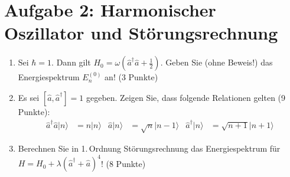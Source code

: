 \documentclass[a4paper,12pt]{article}
\newcommand{\kla}{}
\newcommand{\Ket}{}
\begin{document}
\section*{Aufgabe 2: Harmonischer Oszillator und Störungsrechnung}
\begin{enumerate}
\item[a)] Sei $\hbar=1$. Dann gilt $H_0=\omega\kla\left( {\hat{a}^\dagger\hat{a}+\frac{1}{2}} \right)$. Geben Sie (ohne Beweis!) das Energiespektrum $E_n^{(0)}$ an! (3 Punkte)
\item[b)] Es sei $[\hat{a},\hat{a}^\dagger]=1$ gegeben. Zeigen Sie, dass folgende Relationen gelten (9 Punkte):
\begin{align*}
\hat{a}^\dagger\hat{a}\Ket | {n} \rangle&=n\Ket | {n} \rangle&\hat{a}\Ket | {n} \rangle&=\sqrt{n}\Ket | {n-1} \rangle&\hat{a}^\dagger\Ket | {n} \rangle&=\sqrt{n+1}\Ket | {n+1} \rangle
\end{align*}
\item[c)] Berechnen Sie in 1.\,Ordnung Störungsrechnung das Energiespektrum für $H=H_0+\lambda (\hat{a}^\dagger +\hat{a})^4$! (8 Punkte)
\end{enumerate}
\end{document}

